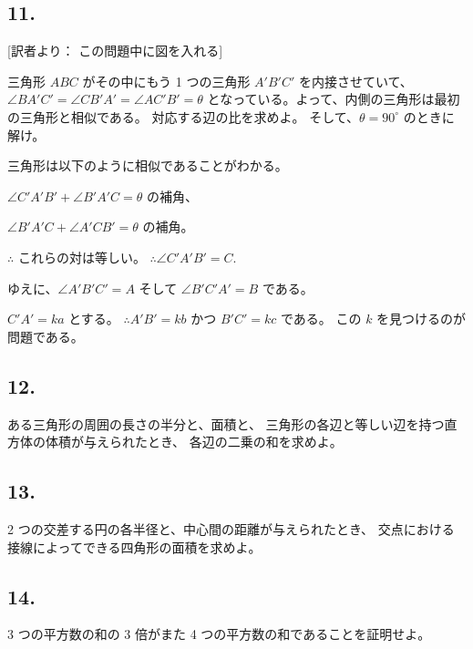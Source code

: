 \subsection*{11.}

[訳者より： この問題中に図を入れる]

 三角形 $ABC$ がその中にもう 1 つの三角形 $A'B'C'$ を内接させていて、
$\angle BA'C' = \angle CB'A' = \angle AC'B' = \theta$
となっている。よって、内側の三角形は最初の三角形と相似である。
対応する辺の比を求めよ。
そして、$\theta = 90^\circ$ のときに解け。

 三角形は以下のように相似であることがわかる。

$\angle C'A'B' + \angle B'A'C = \mbox{$\theta$ の補角}$、

$\angle B'A'C + \angle A'CB' = \mbox{$\theta$ の補角}$。

$\therefore$ これらの対は等しい。 $\therefore \angle C'A'B' = C$.

ゆえに、$\angle A'B'C' = A$ そして $\angle B'C'A' = B$  である。

$C'A' = ka$  とする。
$\therefore A'B' = kb$ かつ $B'C' = kc$ である。
この $k$ を見つけるのが問題である。
\begin{flushright}
[31/3/82]
\end{flushright}


\subsection*{12.}

ある三角形の周囲の長さの半分と、面積と、
三角形の各辺と等しい辺を持つ直方体の体積が与えられたとき、
各辺の二乗の和を求めよ。
\begin{flushright}
[23/1/91]
\end{flushright}


\subsection*{13.}

 2 つの交差する円の各半径と、中心間の距離が与えられたとき、
交点における接線によってできる四角形の面積を求めよ。
\begin{flushright}
[3/89]
\end{flushright}


\subsection*{14.}

3 つの平方数の和の 3 倍がまた 4 つの平方数の和であることを証明せよ。
\begin{flushright}
[2/11/81]
\end{flushright}


